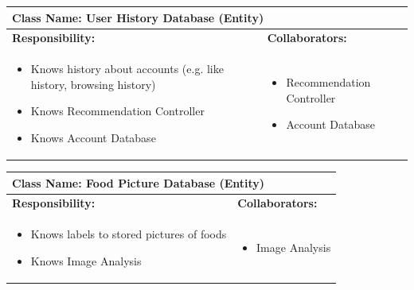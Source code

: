 \documentclass[]{article}
\begin{document}
\begin{table}[H]
	\centering
	\begin{tabular}{|p{7cm}|p{7cm}|}
	\hline 
	 \multicolumn{2}{|l|}{\textbf{Class Name:} User History Database (Entity) }\\
	\hline
	\textbf{Responsibility:} & \textbf{Collaborators:} \\
	\hline
	\raggedright
	\begin{itemize}
		\item Knows history about accounts (e.g. like history, browsing history)
		\item Knows Recommendation Controller
		\item Knows Account Database
	\end{itemize}
	\vspace{1in} & 
	\begin{itemize}
		\item Recommendation Controller
		\item Account Database
	\end{itemize} \\
	\hline
	\end{tabular}
\end{table}

\begin{table}[H]
	\centering
	\begin{tabular}{|p{7cm}|p{7cm}|}
	\hline 
	 \multicolumn{2}{|l|}{\textbf{Class Name:} Food Picture Database (Entity) }\\
	\hline
	\textbf{Responsibility:} & \textbf{Collaborators:} \\
	\hline
	\raggedright
	\begin{itemize}
		\item Knows labels to stored pictures of foods 
		\item Knows Image Analysis
	\end{itemize}
	\vspace{1in} & 
	\begin{itemize}
		\item Image Analysis
	\end{itemize} \\
	\hline
	\end{tabular}
\end{table}
\end{document}
